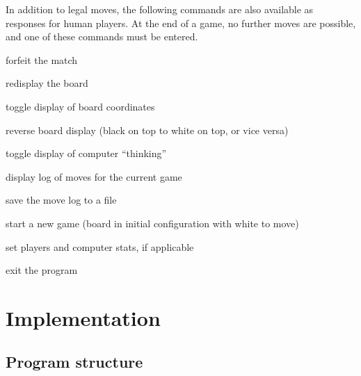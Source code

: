\documentclass[a4paper]{article}
\begin{document}
In addition to legal moves, the following commands are also available
as responses for human players. At the end of a game, no further moves
are possible, and one of these commands must be entered.

\renewenvironment{description}{%
  \begin{basedescript}{%
      \desclabelwidth{0.66in}\desclabelstyle{\nextlinelabel}%
  }%
}{%
  \end{basedescript}%
}

\begin{description}
\item[\texttt{resign}] forfeit the match
\item[\texttt{bd}] redisplay the board
\item[\texttt{coords}] toggle display of board coordinates
\item[\texttt{reverse}] reverse board display (black on top to white on top, or vice versa)
\item[\texttt{think}] toggle display of computer ``thinking''
\item[\texttt{log}] display log of moves for the current game
\item[\texttt{save}] save the move log to a file
\item[\texttt{new}] start a new game (board in initial configuration with white to move)
\item[\texttt{who}] set players and computer stats, if applicable
\item[\texttt{quit}] exit the program
\end{description}

\section{Implementation}

\subsection{Program structure}
\end{document}
